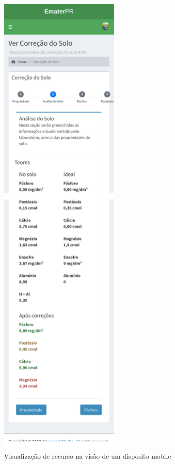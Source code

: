 \begin{figure}[H]
    \centering
    \includegraphics[width=6cm]{./dados/figuras/prototipos/show_mobile.png}
    \caption{Visualização de recurso na visão de um disposito mobile}
    \label{fig:prototipo_show_mobile}
\end{figure}